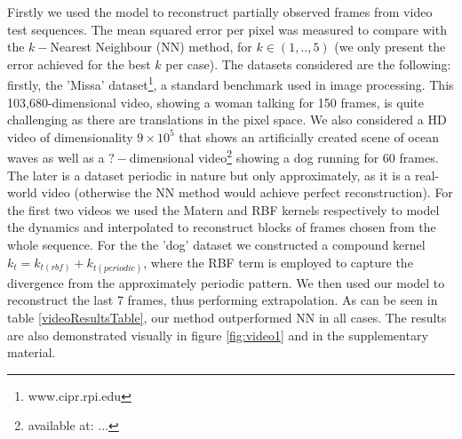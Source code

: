 \documentclass{article} %
\begin{document}
Firstly we used the model to reconstruct partially observed frames
from video test sequences. The mean squared error per pixel was
measured to compare with the $k-$Nearest Neighbour (NN) method, for $k
\in (1,..,5)$ (we only present the error achieved for the best $k$ per
case). The datasets considered are the following: firstly, the 'Missa'
dataset\footnote{www.cipr.rpi.edu}, a standard benchmark used in image
processing. This 103,680-dimensional video, showing a woman talking
for 150 frames, is quite challenging as there are translations in the
pixel space. We also considered a HD video of dimensionality $9 \times
10^5$ that shows an artificially created scene of ocean waves as well
as a $?-$dimensional video\footnote{available at: ...} showing a dog
running for $60$ frames. The later is a dataset periodic in nature but
only approximately, as it is a real-world video (otherwise the NN
method would achieve perfect reconstruction). For the first two videos
we used the Matern and RBF kernels respectively to model the dynamics and interpolated to
reconstruct blocks of frames chosen from the whole sequence. For the
the 'dog' dataset we constructed a compound kernel $k_t = k_{t(rbf)} +
k_{t(periodic)}$, where the RBF term is employed to capture the
divergence from the approximately periodic pattern. We then used our
model to reconstruct the last 7 frames, thus performing
extrapolation. As can be seen in table \ref{videoResultsTable}, our
method outperformed NN in all cases. The results are also demonstrated
visually in figure \ref{fig:video1} and in the supplementary material.



\end{document}

